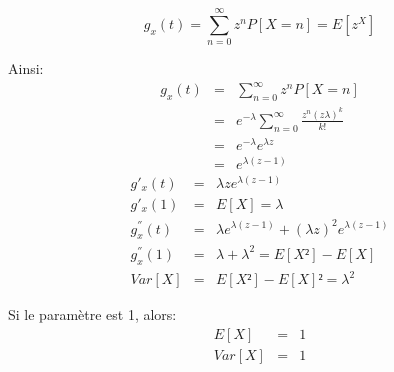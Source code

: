 \documentclass[a4paper]{article}
\begin{document}
\begin{equation}
  g_x(t)=\sum_{n=0}^{\infty}z^nP[X=n]=E[z^X]
\end{equation}

Ainsi:
\begin{eqnarray*}
 g_x(t)&=& \sum_{n=0}^{\infty}z^nP[X=n]\\
 &=& e^{-\lambda}\sum_{n=0}^{\infty}\frac{z^n(z\lambda)^k}{k!}\\
 &=& e^{-\lambda}e^{\lambda z}\\
&=& e^{\lambda(z-1)}
\end{eqnarray*}
\begin{eqnarray*}
 g'_x(t)&=& \lambda ze^{\lambda(z-1)}\\
 g'_x(1)&=&E[X]= \lambda\\
 g^{''}_x(t)&=& \lambda e^{\lambda(z-1)}+(\lambda z)^2e^{\lambda(z-1)}\\
 g^{''}_x(1)&=& \lambda + \lambda^2 = E[X²]-E[X]\\
Var[X] &=& E[X²]-E[X]² = \lambda^2
\end{eqnarray*}

Si le paramètre est 1, alors:
\begin{eqnarray*}
E[X]&=& 1\\
Var[X] &=& 1
\end{eqnarray*}


\subsection{}
\subsection{}
\end{document}
